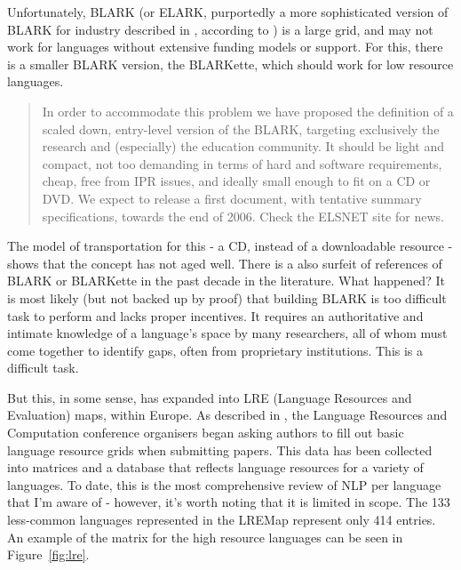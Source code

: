 Unfortunately, BLARK (or ELARK, purportedly a more sophisticated version of BLARK for industry described in \citet{mapelli2003report}, according to \citep{grover2011south}) is a large grid, and may not work for languages without extensive funding models or support. For this, there is a smaller BLARK version, the BLARKette, which should work for low resource languages.

\begin{quote}
In order to accommodate this problem we have proposed the definition of a scaled down, entry-level version of the BLARK, targeting exclusively the research and (especially) the education community. It should be light and compact, not too demanding in terms of hard and software requirements, cheap, free from IPR issues, and ideally small enough to fit on a CD or DVD. We expect to release a first document, with tentative summary specifications, towards the end of 2006. Check the ELSNET site for news. \citep{krauwer2006strengthening}
\end{quote}

The model of transportation for this - a CD, instead of a downloadable resource - shows that the concept has not aged well. There is a also surfeit of references of BLARK or BLARKette in the past decade in the literature. What happened? It is most likely (but not backed up by proof) that building BLARK is too difficult task to perform and lacks proper incentives. It requires an authoritative and intimate knowledge of a language's space by many researchers, all of whom must come together to identify gaps, often from proprietary institutions. This is a difficult task.

But this, in some sense, has expanded into LRE (Language Resources and Evaluation) maps, within Europe. As described in \citet{calzolari2010lrec, del2014lremap, mariani2015language, del2015visualising}, the Language Resources and Computation %
conference organisers began asking authors to fill out basic language resource grids when submitting papers. This data has been collected into matrices and a database that reflects language resources for a variety of languages. To date, this is the most comprehensive review of NLP per language that I'm aware of - however, it's worth noting that it is limited in scope. The 133 less-common languages represented in the LREMap represent only 414 entries. An example of the matrix for the high resource languages can be seen in Figure~\ref{fig:lre}.


